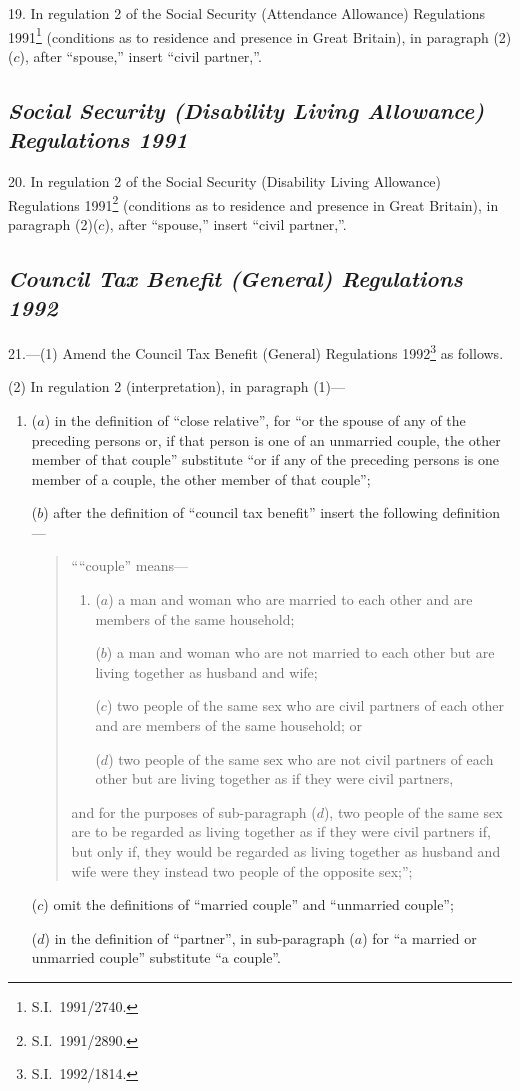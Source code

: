 \documentclass[12pt,a4paper]{article}
\begin{document}
19.  In regulation 2 of the Social Security (Attendance Allowance) Regulations 1991\footnote{S.I.\ 1991/2740.} (conditions as to residence and presence in Great Britain), in paragraph (2)($c$), after “spouse,” insert “civil partner,”.

\subsection*{\itshape Social Security (Disability Living Allowance) Regulations 1991}

20.  In regulation 2 of the Social Security (Disability Living Allowance) Regulations 1991\footnote{S.I.\ 1991/2890.} (conditions as to residence and presence in Great Britain), in paragraph (2)($c$), after “spouse,” insert “civil partner,”.

\subsection*{\itshape Council Tax Benefit (General) Regulations 1992}

21.---(1)  Amend the Council Tax Benefit (General) Regulations 1992\footnote{S.I.\ 1992/1814.} as follows.

(2) In regulation 2 (interpretation), in paragraph (1)—
\begin{enumerate}\item[]
($a$) in the definition of “close relative”, for “or the spouse of any of the preceding persons or, if that person is one of an unmarried couple, the other member of that couple” substitute “or if any of the preceding persons is one member of a couple, the other member of that couple”;

($b$) after the definition of “council tax benefit” insert the following definition—
\begin{quotation}
““couple” means—
\begin{enumerate}\item[]
($a$) 
a man and woman who are married to each other and are members of the same household;

($b$) 
a man and woman who are not married to each other but are living together as husband and wife;

($c$) 
two people of the same sex who are civil partners of each other and are members of the same household; or

($d$) 
two people of the same sex who are not civil partners of each other but are living together as if they were civil partners,
\end{enumerate}
and for the purposes of sub-paragraph ($d$), two people of the same sex are to be regarded as living together as if they were civil partners if, but only if, they would be regarded as living together as husband and wife were they instead two people of the opposite sex;”;
\end{quotation}

($c$) omit the definitions of “married couple” and “unmarried couple”;

($d$) in the definition of “partner”, in sub-paragraph ($a$)  for “a married or unmarried couple” substitute “a couple”.
\end{enumerate}
\end{document}
